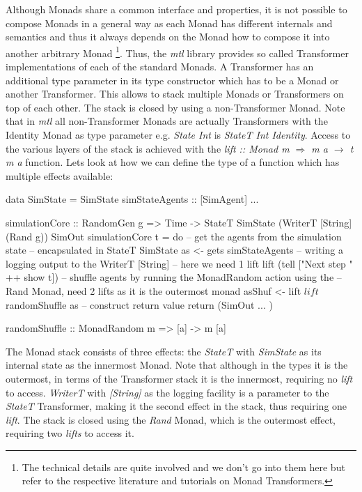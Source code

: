 \medskip

Although Monads share a common interface and properties, it is not possible to compose Monads in a general way as each Monad has different internals and semantics and thus it always depends on the Monad how to compose it into another arbitrary Monad \footnote{The technical details are quite involved and we don't go into them here but refer to the respective literature and tutorials on Monad Transformers.}. Thus, the \textit{mtl} library provides so called Transformer implementations of each of the standard Monads. A Transformer has an additional type parameter in its type constructor which has to be a Monad or another Transformer. This allows to stack multiple Monads or Transformers on top of each other. The stack is closed by using a non-Transformer Monad. Note that in \textit{mtl} all non-Transformer Monads are actually Transformers with the Identity Monad as type parameter e.g. \textit{State Int} is \textit{StateT Int Identity}. Access to the various layers of the stack is achieved with the \textit{lift :: Monad m $\Rightarrow$ m a $\rightarrow$ t m a} function. Lets look at how we can define the type of a function which has multiple effects available:

\begin{HaskellCode}
data SimState = SimState { simStateAgents :: [SimAgent] ... }

simulationCore :: RandomGen g 
               => Time
               -> StateT SimState (WriterT [String] (Rand g)) SimOut
simulationCore t = do
  -- get the agents from the simulation state 
  -- encapsulated in StateT SimState
  as <- gets simStateAgents
  -- writing a logging output to the WriterT [String]
  -- here we need 1 lift 
  lift (tell ["Next step " ++ show t])
  -- shuffle agents by running the MonadRandom action using the
  -- Rand Monad, need 2 lifts as it is the outermost monad
  asShuf <- lift $ lift $ randomShuffle as
  -- construct return value
  return (SimOut { ... })
  
randomShuffle :: MonadRandom m => [a] -> m [a]
\end{HaskellCode}

The Monad stack consists of three effects: the \textit{StateT} with \textit{SimState} as its internal state as the innermost Monad. Note that although in the types it is the outermost, in terms of the Transformer stack it is the innermost, requiring no \textit{lift} to access. \textit{WriterT} with \textit{[String]} as the logging facility is a parameter to the \textit{StateT} Transformer, making it the second effect in the stack, thus requiring one \textit{lift}. The stack is closed using the \textit{Rand} Monad, which is the outermost effect, requiring two \textit{lifts} to access it.

